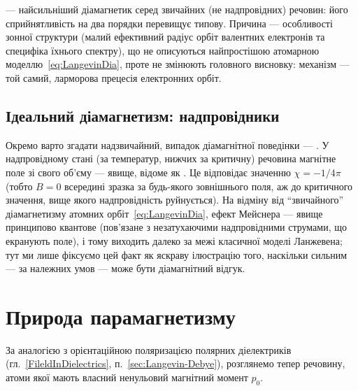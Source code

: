 \begin{Attention}
	 --- найсильніший діамагнетик серед звичайних (не надпровідних) речовин: його сприйнятливість на два порядки перевищує
	типову. Причина --- особливості зонної структури (малий ефективний радіус орбіт валентних електронів та специфіка їхнього спектру), що не
	описуються найпростішою атомарною моделлю~\eqref{eq:LangevinDia}, проте не змінюють головного висновку: механізм --- той самий, ларморова
	прецесія електронних орбіт.
\end{Attention}

\subsection*{Ідеальний діамагнетизм: надпровідники}

Окремо варто згадати надзвичайний,  випадок діамагнітної поведінки --- . У надпровідному стані (за
температур, нижчих за критичну) речовина  магнітне поле зі свого об'єму --- явище, відоме як .
Це відповідає значенню $\chi = -1/4\pi$ (тобто $B=0$ всередині зразка за будь-якого зовнішнього поля, аж до критичного значення, вище якого
надпровідність руйнується). На відміну від \enquote{звичайного} діамагнетизму атомних орбіт~\eqref{eq:LangevinDia}, ефект Мейснера --- явище
принципово квантове (пов'язане з незатухаючими надпровідними струмами, що екранують поле), і тому виходить далеко за межі класичної моделі
Ланжевена; тут ми лише фіксуємо цей факт як яскраву ілюстрацію того, наскільки сильним --- за належних умов --- може бути діамагнітний відгук.

\section{Природа парамагнетизму}

За аналогією з орієнтаційною поляризацією полярних діелектриків (гл.~\ref{FileldInDielectrics}, п.~\ref{sec:Langevin-Debye}), розглянемо тепер
речовину, атоми якої мають власний ненульовий магнітний момент $p_0$.

